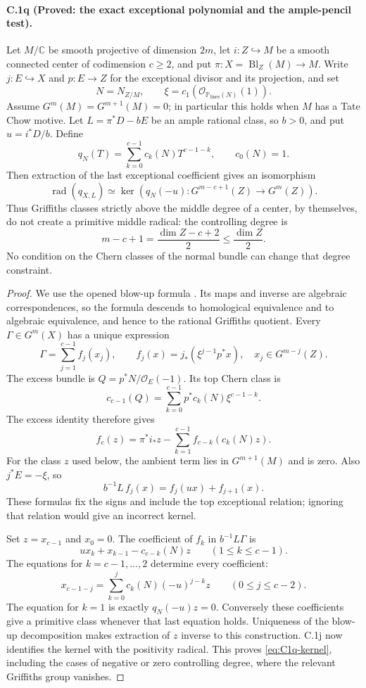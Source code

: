 \paragraph{C.1q (Proved: the exact exceptional polynomial and the ample-pencil test).}
Let $M/\mathbb C$ be smooth projective of dimension $2m$, let
$i:Z\hookrightarrow M$ be a smooth connected center of codimension
$c\ge2$, and put $\pi:X=\operatorname{Bl}_Z(M)\to M$.
Write $j:E\hookrightarrow X$ and $p:E\to Z$ for the exceptional
divisor and its projection, and set
\[
 N=N_{Z/M},\qquad \xi=c_1(\mathcal O_{\mathbb P_{\mathrm{lines}}(N)}(1)).
\]
Assume $G^m(M)=G^{m+1}(M)=0$; in particular this holds when
$M$ has a Tate Chow motive. Let
$L=\pi^*D-bE$ be an ample rational class, so $b>0$, and put
$u=i^*D/b$. Define
\[
 q_N(T)=\sum_{k=0}^{c-1}c_k(N)T^{c-1-k},\qquad c_0(N)=1.
\]
Then extraction of the last exceptional coefficient gives an
isomorphism
\begin{equation}\label{eq:C1q-kernel}
 \operatorname{rad}(q_{X,L})\simeq
 \ker\left(q_N(-u):G^{m-c+1}(Z)\longrightarrow G^m(Z)\right).
\end{equation}
Thus Griffiths classes strictly above the middle degree of a
center, by themselves, do not create a primitive middle radical:
the controlling degree is
\[
             m-c+1=\frac{\dim Z-c+2}{2}\le\frac{\dim Z}{2}.
\]
No condition on the Chern classes of the normal bundle can change
that degree constraint.

\begin{proof}
We use the opened blow-up formula
\citep[Theorem 2.8(3), and equation (2.2)]{cyJiang2023}.
Its maps and inverse are algebraic correspondences, so the
formula descends to homological equivalence and to algebraic
equivalence, and hence to the rational Griffiths quotient.
Every $\Gamma\in G^m(X)$ has a unique expression
\[
 \Gamma=\sum_{j=1}^{c-1}f_j(x_j),\qquad
 f_j(x)=j_*(\xi^{j-1}p^*x),\quad x_j\in G^{m-j}(Z).
\]
The excess bundle is $Q=p^*N/\mathcal O_E(-1)$. Its top Chern
class is
\[
 c_{c-1}(Q)=\sum_{k=0}^{c-1}p^*c_k(N)\xi^{c-1-k}.
\]
The excess identity therefore gives
\[
 f_c(z)=\pi^*i_*z-\sum_{k=1}^{c-1}f_{c-k}(c_k(N)z).
\]
For the class $z$ used below, the ambient term lies in
$G^{m+1}(M)$ and is zero. Also $j^*E=-\xi$, so
\[
 b^{-1}L\,f_j(x)=f_j(ux)+f_{j+1}(x).
\]
These formulas fix the signs and include the top exceptional
relation; ignoring that relation would give an incorrect kernel.

Set $z=x_{c-1}$ and $x_0=0$. The coefficient of $f_k$ in
$b^{-1}L\Gamma$ is
\[
       ux_k+x_{k-1}-c_{c-k}(N)z\qquad(1\le k\le c-1).
\]
The equations for $k=c-1,\ldots,2$ determine every coefficient:
\[
 x_{c-1-j}=\sum_{k=0}^{j}c_k(N)(-u)^{j-k}z
                    \qquad(0\le j\le c-2).
\]
The equation for $k=1$ is exactly $q_N(-u)z=0$.
Conversely these coefficients give a primitive class whenever
that last equation holds. Uniqueness of the blow-up decomposition
makes extraction of $z$ inverse to this construction. C.1j now
identifies the kernel with the positivity radical. This proves
\eqref{eq:C1q-kernel}, including the cases of negative or zero
controlling degree, where the relevant Griffiths group vanishes.
\end{proof}

